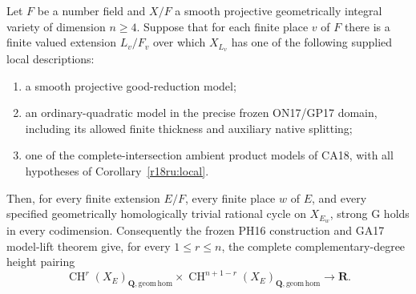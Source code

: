 \begin{corollary}
\label{r18ru:global-criterion}
Let $F$ be a number field and $X/F$ a smooth projective geometrically
integral variety of dimension $n\ge4$.  Suppose that for each finite
place $v$ of $F$ there is a finite valued extension $L_v/F_v$ over
which $X_{L_v}$ has one of the following supplied local descriptions:
\begin{enumerate}
\item a smooth projective good-reduction model;
\item an ordinary-quadratic model in the precise frozen ON17/GP17
      domain, including its allowed finite thickness and auxiliary
      native splitting;
\item one of the complete-intersection ambient product models of
      CA18, with all hypotheses of Corollary~\ref{r18ru:local}.
\end{enumerate}
Then, for every finite extension $E/F$, every finite place $w$ of
$E$, and every specified geometrically homologically trivial
rational cycle on $X_{E_w}$, strong G holds in every codimension.
Consequently the frozen PH16 construction and GA17 model-lift theorem
give, for every $1\le r\le n$, the complete complementary-degree
height pairing
\[
 \operatorname{CH}^r(X_E)_{\mathbf Q,\mathrm{geom\,hom}}
 \times
 \operatorname{CH}^{n+1-r}(X_E)_{\mathbf Q,\mathrm{geom\,hom}}
                         \longrightarrow\mathbf R.
 \tag{RU18.1}\label{r18ru:height}
\]
\end{corollary}

